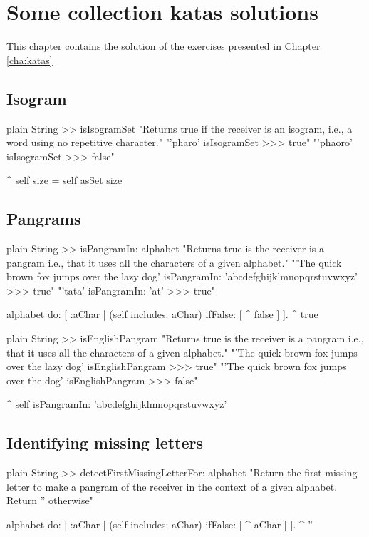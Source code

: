 \documentclass[10pt,twoside,english]{_support/latex/sbabook/sbabook}
\begin{document}
\frontmatter
\pagestyle{plain}

\tableofcontents*
\clearpage\listoffigures

\mainmatter

\chapter{Some collection katas solutions}\label{cha:katassolution}
This chapter contains the solution of the exercises presented in Chapter \ref{cha:katas}
\section{Isogram}
\begin{displaycode}{plain}
String >> isIsogramSet
	"Returns true if the receiver is an isogram, i.e., a word using no repetitive character."
	"'pharo' isIsogramSet
	>>> true"
	"'phaoro' isIsogramSet
	>>> false"
	
	^ self size = self asSet size 
\end{displaycode}
\section{Pangrams}
 

\begin{displaycode}{plain}
String >> isPangramIn: alphabet
	"Returns true is the receiver is a pangram i.e., that it uses all the characters of a given alphabet."
	"'The quick brown fox jumps over the lazy dog' isPangramIn: 'abcdefghijklmnopqrstuvwxyz'
	>>> true"
	"'tata' isPangramIn: 'at'
	>>> true"

	alphabet do: [ :aChar |
		(self includes: aChar)
			ifFalse: [ ^ false ]
		].
	^ true
\end{displaycode}

\begin{displaycode}{plain}
String >> isEnglishPangram
	"Returns true is the receiver is a pangram i.e., that it uses all the characters of a given alphabet."
	"'The quick brown fox jumps over the lazy dog' isEnglishPangram
	>>> true"
	"'The quick brown fox jumps over the dog' isEnglishPangram
	>>> false"

	^ self isPangramIn: 'abcdefghijklmnopqrstuvwxyz'
\end{displaycode}
\section{Identifying missing letters}
\begin{displaycode}{plain}
String >> detectFirstMissingLetterFor: alphabet
	"Return the first missing letter to make a pangram of the receiver in the context of a given alphabet. 
	Return '' otherwise"
	
	alphabet do: [ :aChar |
		(self includes: aChar)
			ifFalse: [ ^ aChar ]
		].
	^ ''
\end{displaycode}
\end{document}
